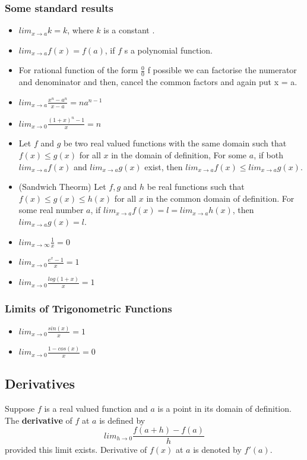 \documentclass[12pt]{article}
\begin{document}
\subsubsection*{Some standard results}
\begin{itemize}
    \item $lim_{x \rightarrow a} k = k $, where $k$ is a constant .
    \item $lim_{x \rightarrow a}f(x) = f(a)$, if $f$ s a polynomial function.
    \item For  rational function of the form $\frac{0}{0}$ f possible we can factorise the numerator and denominator and then, cancel the common factors and again put x = a. 
    \item $lim_{x \rightarrow a} \frac{x^n-a^n}{x-a}=na^{n-1}$
    \item $lim_{x \rightarrow 0} \frac{(1+x)^n - 1}{x}=n$
    \item Let $f$ and $g$ be two real valued functions with the same domain such that
   $ f (x) \leq g( x)$ for all $x$ in the domain of definition, For some $a$, if both $lim_{x \rightarrow a} f(x)$ and $lim_{x \rightarrow a} g(x)$ exist, then $lim_{x \rightarrow a} f(x) \leq lim_{x \rightarrow a} g(x)$.
   \item(Sandwich Theorm) Let $f, g$ and $h$ be real functions such that
   $f (x) \leq g( x) \leq h(x)$ for all $x$ in the common domain of definition. For some real number
   $a$, if $lim_{x \rightarrow a}f(x) = l = lim_{x \rightarrow a}
   h(x)$, then $lim_{x \rightarrow a} g(x) = l$.
   \item  $lim_{x \rightarrow \infty}\frac{1}{x}=0$
   \item  $lim_{x \rightarrow 0}\frac{e^x -1}{x}=1$
   \item $lim_{x \rightarrow 0} \frac{log(1+x)}{x}=1$
   
\end{itemize}

\subsubsection*{Limits of Trigonometric Functions}
\begin{itemize}
    \item $lim_{x \rightarrow 0}\frac{sin (x)}{x}=1$
    \item $lim_{x \rightarrow 0}\frac{1- cos (x)}{x}=0$
\end{itemize}

\subsection*{Derivatives}
Suppose $f$ is a real valued function and $a$ is a point in its domain of
definition. The \textbf{derivative} of $f$ at $a$ is defined by
$$lim_{h \rightarrow 0}\frac{f(a+h)-f(a)}{h}$$
provided this limit exists. Derivative of $f (x)$ at $a$ is denoted by $f'(a)$.
\end{document}
